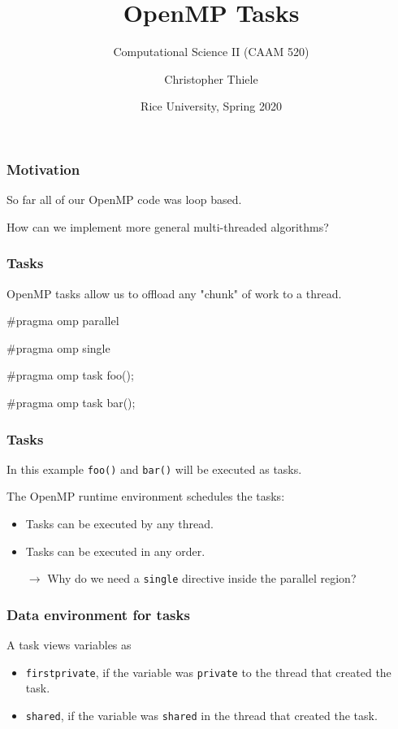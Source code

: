 \documentclass[12pt,t]{beamer}
\newcommand{\conclude}[1]{%
  \begin{itemize}
    \item[$\rightarrow$]#1
  \end{itemize}
}
\begin{document}
  \title{OpenMP Tasks}
  \subtitle{Computational Science II (CAAM 520)}
  \author{Christopher Thiele}
  \date{Rice University, Spring 2020}

  \begin{frame}
    \titlepage
  \end{frame}


  \begin{frame}[fragile]
    \frametitle{Motivation}

    So far all of our OpenMP code was loop based.

    How can we implement more general multi-threaded algorithms?
  \end{frame}

  \begin{frame}[fragile]
    \frametitle{Tasks}

    OpenMP tasks allow us to offload any "chunk" of work to a thread.
    \begin{code}
#pragma omp parallel
{
  #pragma omp single
  {
    #pragma omp task
    foo();

    #pragma omp task
    bar();
  }
}
    \end{code}
  \end{frame}

  \begin{frame}[fragile]
    \frametitle{Tasks}

    In this example \texttt{foo()} and \texttt{bar()} will be executed as tasks.

    The OpenMP runtime environment schedules the tasks:
    \begin{itemize}
      \item Tasks can be executed by any thread.
      \item Tasks can be executed in any order.
    \end{itemize}
    \conclude{Why do we need a \texttt{single} directive inside the parallel region?}
  \end{frame}

  \begin{frame}[fragile]
    \frametitle{Data environment for tasks}

    A task views variables as
    \begin{itemize}
      \item \texttt{firstprivate}, if the variable was \texttt{private} to the thread that created the task.
      \item \texttt{shared}, if the variable was \texttt{shared} in the thread that created the task.
    \end{itemize}
  \end{frame}
\end{document}
